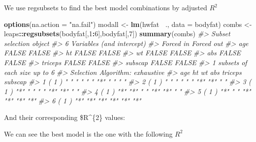 \documentclass[]{article}
\newenvironment{Shaded}{\begin{snugshade}}{\end{snugshade}}
\newcommand{\CommentTok}[1]{\textcolor[rgb]{0.56,0.35,0.01}{\textit{#1}}}
\newcommand{\DataTypeTok}[1]{\textcolor[rgb]{0.13,0.29,0.53}{#1}}
\newcommand{\DecValTok}[1]{\textcolor[rgb]{0.00,0.00,0.81}{#1}}
\newcommand{\KeywordTok}[1]{\textcolor[rgb]{0.13,0.29,0.53}{\textbf{#1}}}
\newcommand{\NormalTok}[1]{#1}
\newcommand{\OperatorTok}[1]{\textcolor[rgb]{0.81,0.36,0.00}{\textbf{#1}}}
\newcommand{\StringTok}[1]{\textcolor[rgb]{0.31,0.60,0.02}{#1}}
\begin{document}
We use regsubsets to find the best model combinations by adjusted
\(R^{2}\)

\begin{Shaded}
\begin{Highlighting}[]
\KeywordTok{options}\NormalTok{(}\DataTypeTok{na.action =} \StringTok{"na.fail"}\NormalTok{)}
\NormalTok{modall <-}\StringTok{ }\KeywordTok{lm}\NormalTok{(hwfat }\OperatorTok{~}\NormalTok{., }\DataTypeTok{data =}\NormalTok{ bodyfat)}
\NormalTok{combs <-}\StringTok{ }\NormalTok{leaps}\OperatorTok{::}\KeywordTok{regsubsets}\NormalTok{(bodyfat[,}\DecValTok{1}\OperatorTok{:}\DecValTok{6}\NormalTok{],bodyfat[,}\DecValTok{7}\NormalTok{])}
\KeywordTok{summary}\NormalTok{(combs)}
\CommentTok{#> Subset selection object}
\CommentTok{#> 6 Variables  (and intercept)}
\CommentTok{#>         Forced in Forced out}
\CommentTok{#> age         FALSE      FALSE}
\CommentTok{#> ht          FALSE      FALSE}
\CommentTok{#> wt          FALSE      FALSE}
\CommentTok{#> abs         FALSE      FALSE}
\CommentTok{#> triceps     FALSE      FALSE}
\CommentTok{#> subscap     FALSE      FALSE}
\CommentTok{#> 1 subsets of each size up to 6}
\CommentTok{#> Selection Algorithm: exhaustive}
\CommentTok{#>          age ht  wt  abs triceps subscap}
\CommentTok{#> 1  ( 1 ) " " " " " " "*" " "     " "    }
\CommentTok{#> 2  ( 1 ) " " " " " " "*" "*"     " "    }
\CommentTok{#> 3  ( 1 ) "*" " " " " "*" "*"     " "    }
\CommentTok{#> 4  ( 1 ) "*" "*" " " "*" "*"     " "    }
\CommentTok{#> 5  ( 1 ) "*" " " "*" "*" "*"     "*"    }
\CommentTok{#> 6  ( 1 ) "*" "*" "*" "*" "*"     "*"}
\end{Highlighting}
\end{Shaded}

And their corresponding \$R\^{}\{2\} values:

\begin{Shaded}
\end{Shaded}

We can see the best model is the one with the following \(R^{2}\)

\begin{Shaded}
\end{Shaded}
\end{document}
